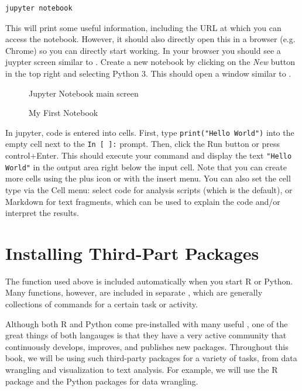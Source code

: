 \begin{verbatim}
jupyter notebook
\end{verbatim}

This will print some useful information, including the URL at which you can access the notebook.
However, it should also directly open this in a browser (e.g. Chrome) so you can directly start working. 
In your browser you should see a juypter screen similar to .
Create a new notebook by clicking on the \emph{New} button in the top right and selecting Python 3.
This should open a window similar to .

\begin{figure}
  \caption{Jupyter Notebook main screen}\label{fig:jupyter}
\end{figure}
\begin{figure}
  \caption{My First Notebook}\label{fig:jupyter2}
\end{figure}

In jupyter, code is entered into cells.
First, type \verb|print("Hello World")| into the empty cell next to the \verb|In [ ]:| prompt.
Then, click the Run button or press control+Enter. This should execute your command and display
the text \verb|"Hello World"| in the output area right below the input cell.
Note that you can create more cells using the plus icon or with the insert menu.
You can also set the cell type via the Cell menu: select code for analysis scripts (which is the default),
or Markdown for text fragments, which can be used to explain the code and/or interpret the results.

\section{Installing Third-Part Packages}

The  function used above is included automatically when you start R or Python.
Many functions, however, are included in separate , which are
generally collections of commands for a certain task or activity.

Although both R and Python come pre-installed with many useful ,
one of the great things of both langauges is that they have a very active community that continuously develops, improves, and publishes new packages.
Throughout this book, we will be using such third-party packages for a variety of tasks, from data wrangling and visualization to text analysis.
For example, we will use the R package  and the Python packages  for data wrangling.

